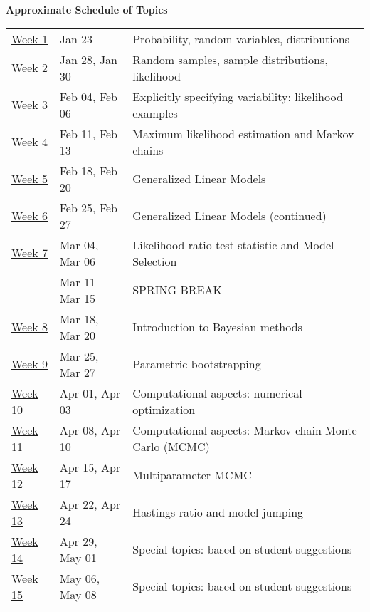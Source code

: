 \documentclass[11pt]{article}
\begin{document}
{\bf Approximate Schedule of Topics}\\
\begin{table}[htp]
\begin{center}
\begin{tabular}{|ll|p{4in}|}
\hline
\underline{Week 1} &  Jan 23 & Probability, random variables, distributions  \\
\underline{Week 2} &  Jan 28, Jan 30 & Random samples, sample distributions, likelihood  \\
\underline{Week 3} &  Feb 04, Feb 06 & Explicitly specifying variability:  likelihood examples \\
\underline{Week 4} &  Feb 11, Feb 13 & Maximum likelihood estimation and Markov chains\\
\underline{Week 5} &  Feb 18, Feb 20 & Generalized Linear Models  \\
\underline{Week 6} &  Feb 25, Feb 27 & Generalized Linear Models (continued) \\
\underline{Week 7} &  Mar 04, Mar 06 & Likelihood ratio test statistic and Model Selection\\
& Mar 11 - Mar 15 & SPRING BREAK \\
\underline{Week 8} &  Mar 18, Mar 20 & Introduction to Bayesian methods\\
\underline{Week 9} &  Mar 25, Mar 27  & Parametric bootstrapping \\
\underline{Week 10} & Apr 01, Apr 03 & Computational aspects: numerical optimization \\
\underline{Week 11} & Apr 08, Apr 10  &  Computational  aspects: Markov chain Monte Carlo (MCMC)\\
\underline{Week 12} & Apr 15, Apr 17  &  Multiparameter  MCMC \\
\underline{Week 13} & Apr 22, Apr 24  &  Hastings ratio and model jumping \\
\underline{Week 14} & Apr 29, May 01  &  Special topics: based on student suggestions\\
\underline{Week 15} & May 06, May 08  &  Special topics: based on student suggestions \\
\hline
\end{tabular}
\end{center}
\label{default}
\end{table}%
\end{document}
